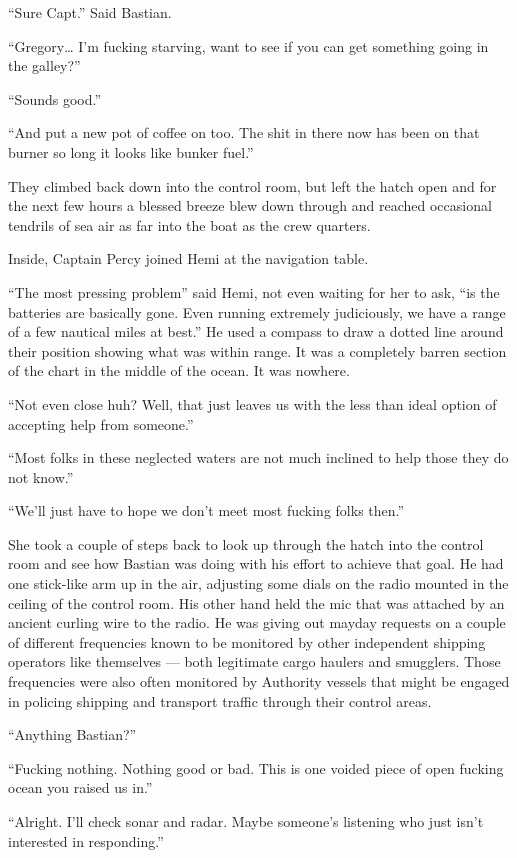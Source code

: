 \documentclass[
]{scrbook}
\begin{document}
``Sure Capt.'' Said Bastian.

``Gregory\ldots{} I'm fucking starving, want to see if you can get
something going in the galley?''

``Sounds good.''

``And put a new pot of coffee on too. The shit in there now has been on
that burner so long it looks like bunker fuel.''

They climbed back down into the control room, but left the hatch open
and for the next few hours a blessed breeze blew down through and
reached occasional tendrils of sea air as far into the boat as the crew
quarters.

Inside, Captain Percy joined Hemi at the navigation table.

``The most pressing problem'' said Hemi, not even waiting for her to
ask, ``is the batteries are basically gone. Even running extremely
judiciously, we have a range of a few nautical miles at best.'' He used
a compass to draw a dotted line around their position showing what was
within range. It was a completely barren section of the chart in the
middle of the ocean. It was nowhere.

``Not even close huh? Well, that just leaves us with the less than ideal
option of accepting help from someone.''

``Most folks in these neglected waters are not much inclined to help
those they do not know.''

``We'll just have to hope we don't meet most fucking folks then.''

She took a couple of steps back to look up through the hatch into the
control room and see how Bastian was doing with his effort to achieve
that goal. He had one stick-like arm up in the air, adjusting some dials
on the radio mounted in the ceiling of the control room. His other hand
held the mic that was attached by an ancient curling wire to the radio.
He was giving out mayday requests on a couple of different frequencies
known to be monitored by other independent shipping operators like
themselves --- both legitimate cargo haulers and smugglers. Those
frequencies were also often monitored by Authority vessels that might be
engaged in policing shipping and transport traffic through their control
areas.

``Anything Bastian?''

``Fucking nothing. Nothing good or bad. This is one voided piece of open
fucking ocean you raised us in.''

``Alright. I'll check sonar and radar. Maybe someone's listening who
just isn't interested in responding.''
\end{document}

